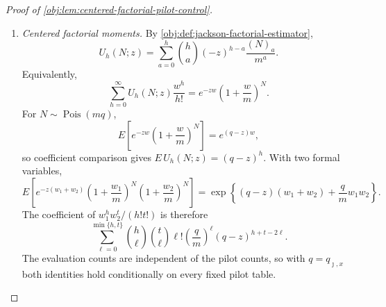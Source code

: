 \documentclass[11pt]{article}
\begin{document}
\begin{proof}[Proof of \cref{obj:lem:centered-factorial-pilot-control}]
\begin{enumerate}
\item \label{item:pf-centered-factorial-moments}\emph{Centered factorial moments.}
By \cref{obj:def:jackson-factorial-estimator},
\[
U_h(N;z)=\sum_{a=0}^{h}\binom ha(-z)^{h-a}\frac{(N)_a}{m^a}.
\]
Equivalently,
\[
\sum_{h=0}^{\infty}U_h(N;z)\frac{w^h}{h!}
=
e^{-zw}\left(1+\frac wm\right)^N .
\]
For \(N\sim\operatorname{Pois}(mq)\),
\[
E\left[e^{-zw}\left(1+\frac wm\right)^N\right]
=
e^{(q-z)w},
\]
so coefficient comparison gives \(E\,U_h(N;z)=(q-z)^h\).  With two formal variables,
\[
E\left[
e^{-z(w_1+w_2)}
\left(1+\frac {w_1}m\right)^N
\left(1+\frac {w_2}m\right)^N
\right]
=
\exp\left\{(q-z)(w_1+w_2)+\frac qm w_1w_2\right\}.
\]
The coefficient of \(w_1^h w_2^t/(h!t!)\) is therefore
\[
\sum_{\ell=0}^{\min\{h,t\}}
\binom h\ell\binom t\ell\ell!
\left(\frac qm\right)^\ell
(q-z)^{h+t-2\ell}.
\]
The evaluation counts are independent of the pilot counts, so with
\(q=q_{\jmath,x}\) both identities hold conditionally on every fixed pilot table.


\end{enumerate}
\end{proof}
\end{document}
